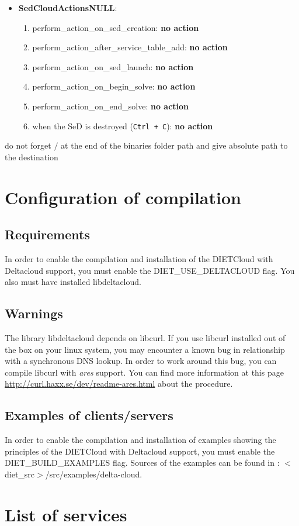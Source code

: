 \begin{itemize}
  \item \textbf{SedCloudActionsNULL}:
    \begin{enumerate}
        \item perform\_action\_on\_sed\_creation: \textbf{no action}
        \item perform\_action\_after\_service\_table\_add: \textbf{no action}
        \item perform\_action\_on\_sed\_launch: \textbf{no action}
        \item perform\_action\_on\_begin\_solve: \textbf{no action}
        \item perform\_action\_on\_end\_solve: \textbf{no action}
        \item when the SeD is destroyed (\texttt{Ctrl + C}): \textbf{no action}
   \end{enumerate}
\end{itemize}

do not forget $/$ at the end of the binaries folder path and give absolute path to the destination

\section{Configuration of compilation}

\subsection{Requirements}

In order to enable the compilation and installation of the DIETCloud
with Deltacloud support, you must enable the DIET\_USE\_DELTACLOUD
flag. You also must have installed libdeltacloud.

\subsection{Warnings}

The library libdeltacloud depends on libcurl. If you use libcurl
installed out of the box on your linux system, you may encounter a known bug
in relationship with a synchronous DNS lookup. In order to work around
this bug, you can compile libcurl with \emph{ares} support. You can find more
information at this page
\url{http://curl.haxx.se/dev/readme-ares.html} about the procedure.

\subsection{Examples of clients/servers}

In order to enable the compilation and installation of examples
showing the principles of the DIETCloud with Deltacloud support, you
must enable the DIET\_BUILD\_EXAMPLES flag. Sources of the examples
can be found in : $<$diet\_src$>$/src/examples/delta-cloud.


\section{List of services}
